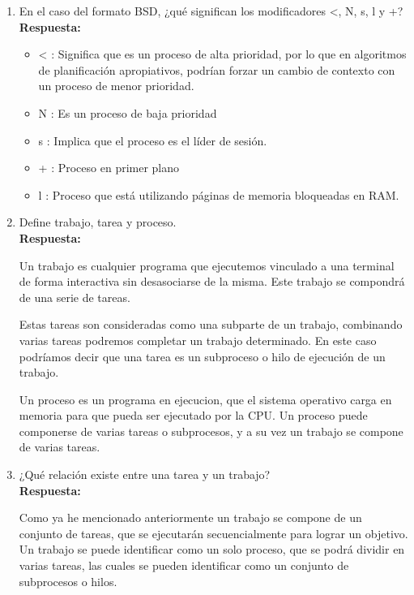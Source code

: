 \documentclass[a4paper,12pt]{article}
\begin{document}
\begin{enumerate}[label=\textbf{Pregunta \arabic*.}]
\begin{itemize}
    \end{itemize}


    \item En el caso del formato BSD, ¿qué significan los modificadores <, N, s, l y +? \\ %
    \textbf{Respuesta:} 
    
    \begin{itemize}
        \item < : Significa que es un proceso de alta prioridad, por lo que en algoritmos de planificación apropiativos, podrían forzar un cambio de contexto con un proceso de menor prioridad.
        \item N : Es un proceso de baja prioridad
        \item s : Implica que el proceso es el líder de sesión.
        \item + : Proceso en primer plano
        \item l : Proceso que está utilizando páginas de memoria bloqueadas en RAM.
    \end{itemize}
    \newpage
    \item Define trabajo, tarea y proceso. \\ %
    \textbf{Respuesta:} 

    Un trabajo es cualquier programa que ejecutemos vinculado a una terminal de forma interactiva sin desasociarse de la misma. Este trabajo se compondrá de una serie de tareas.

    Estas tareas son consideradas como una subparte de un trabajo, combinando varias tareas podremos completar un trabajo determinado. En este caso podríamos decir que una tarea es un subproceso o hilo de ejecución de un trabajo.

    Un proceso es un programa en ejecucion, que el sistema operativo carga en memoria para que pueda ser ejecutado por la CPU. Un proceso puede componerse de varias tareas o subprocesos, y a su vez un trabajo se compone de varias tareas.


    \item ¿Qué relación existe entre una tarea y un trabajo? \\ %
    \textbf{Respuesta:} 
    
    Como ya he mencionado anteriormente un trabajo se compone de un conjunto de tareas, que se ejecutarán secuencialmente para lograr un objetivo. Un trabajo se puede identificar como un solo proceso, que se podrá dividir en varias tareas, las cuales se pueden identificar como un conjunto de subprocesos o hilos. 





\end{enumerate}
\end{document}
